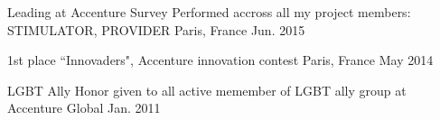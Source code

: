 
\begin{cvhonors}

  \cvhonor
    {Leading at Accenture} %
    {Survey Performed accross all my project members: STIMULATOR, PROVIDER} %
    {Paris, France} %
    {Jun. 2015} %

  \cvhonor
    {1st place} %
    {``Innovaders", Accenture innovation contest} %
    {Paris, France} %
    {May 2014} %

  \cvhonor
    {LGBT Ally} %
    {Honor given to all active memember of LGBT ally group at Accenture} %
    {Global} %
    {Jan. 2011} %

\end{cvhonors}
